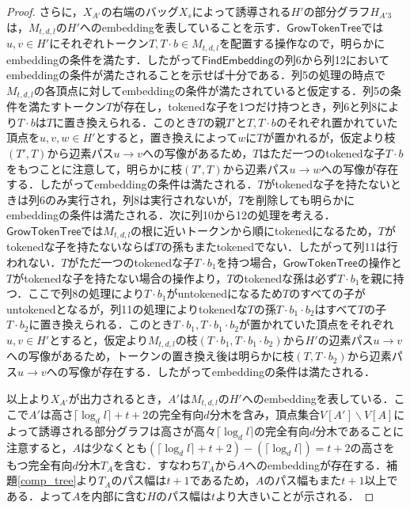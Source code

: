 \documentclass[master]{kuisthesis}		%
\theoremstyle{plain}
\theoremstyle{definition}
\begin{document}
\begin{proof}
さらに，$X_{A'}$の右端のバッグ$X_s$によって誘導される$H'$の部分グラフ$H_{A'3}$は，$M_{t, d, l}$の$H'$へのembeddingを表していることを示す．$\mathsf{GrowTokenTree}$では$u, v \in H'$にそれぞれトークン$T, T\cdot b \in M_{t, d, l}$を配置する操作なので，明らかにembeddingの条件を満たす．したがって$\mathsf{FindEmbedding}$の列6から列12においてembeddingの条件が満たされることを示せば十分である．列5の処理の時点で$M_{t, d, l}$の各頂点に対してembeddingの条件が満たされていると仮定する．列5の条件を満たすトークン$T$が存在し，tokenedな子を1つだけ持つとき，列6と列8により$T \cdot b$は$T$に置き換えられる．このとき$T$の親$T'$と$T, T \cdot b$のそれぞれ置かれていた頂点を$u, v, w \in H'$とすると，置き換えによって$w$に$T$が置かれるが，仮定より枝$(T', T)$から辺素パス$u \rightarrow v$への写像があるため，$T$はただ一つのtokenedな子$T \cdot b$をもつことに注意して，明らかに枝$(T', T)$から辺素パス$u \rightarrow w$への写像が存在する．したがってembeddingの条件は満たされる．$T$がtokenedな子を持たないときは列6のみ実行され，列8は実行されないが，$T$を削除しても明らかにembeddingの条件は満たされる．次に列10から12の処理を考える．$\mathsf{GrowTokenTree}$では$M_{t, d, l}$の根に近いトークンから順にtokenedになるため，$T$がtokenedな子を持たないならば$T$の孫もまたtokenedでない．したがって列11は行われない．$T$がただ一つのtokenedな子$T \cdot b_1$を持つ場合，$\mathsf{GrowTokenTree}$の操作と$T$がtokenedな子を持たない場合の操作より，$T$のtokenedな孫は必ず$T \cdot b_1$を親に持つ．ここで列8の処理により$T \cdot b_1$がuntokenedになるため$T$のすべての子がuntokenedとなるが，列11の処理によりtokenedな$T$の孫$T \cdot b_1 \cdot b_2$はすべて$T$の子$T \cdot b_2$に置き換えられる．このとき$T \cdot b_1, T \cdot b_1 \cdot b_2$が置かれていた頂点をそれぞれ$u, v \in H'$とすると，仮定より$M_{t, d, l}$の枝$(T \cdot b_1, T \cdot b_1 \cdot b_2)$から$H'$の辺素パス$u \rightarrow v$への写像があるため，トークンの置き換え後は明らかに枝$(T, T \cdot b_2)$から辺素パス$u \rightarrow v$への写像が存在する．したがってembeddingの条件は満たされる．

以上より$X_{A'}$が出力されるとき，$A'$は$M_{t, d, l}$の$H'$へのembeddingを表している．ここで$A'$は高さ$\lceil \log_d l \rceil +t+2$の完全有向$d$分木を含み，頂点集合$V[A'] \backslash V[A]$によって誘導される部分グラフは高さが高々$\lceil \log_d l \rceil$の完全有向$d$分木であることに注意すると，$A$は少なくとも$(\lceil \log_d l \rceil +t+2) -(\lceil \log_d l \rceil) = t+2$の高さをもつ完全有向$d$分木$T_A$を含む．すなわち$T_A$から$A$へのembeddingが存在する．補題\ref{comp_tree}より$T_A$のパス幅は$t+1$であるため，$A$のパス幅もまた$t+1$以上である．よって$A$を内部に含む$H$のパス幅は$t$より大きいことが示される．


\end{proof}
\end{document}
